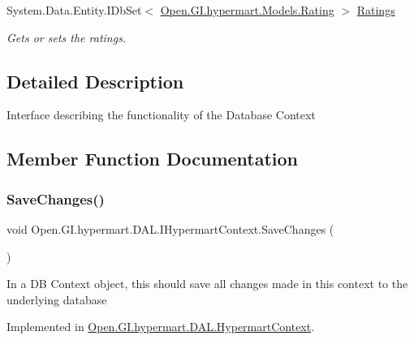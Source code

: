 \begin{DoxyCompactItemize}
System.\+Data.\+Entity.\+I\+Db\+Set$<$ \hyperlink{class_open_1_1_g_i_1_1hypermart_1_1_models_1_1_rating}{Open.\+G\+I.\+hypermart.\+Models.\+Rating} $>$ \hyperlink{interface_open_1_1_g_i_1_1hypermart_1_1_d_a_l_1_1_i_hypermart_context_a4e1ab8903a144091a90920c6e3e62d32}{Ratings}
\begin{DoxyCompactList}\small\item\em Gets or sets the ratings. \end{DoxyCompactList}\end{DoxyCompactItemize}


\subsection{Detailed Description}
Interface describing the functionality of the Database Context 



\subsection{Member Function Documentation}
\hypertarget{interface_open_1_1_g_i_1_1hypermart_1_1_d_a_l_1_1_i_hypermart_context_aacc5015260d97950f2a10d7673873304}{}\label{interface_open_1_1_g_i_1_1hypermart_1_1_d_a_l_1_1_i_hypermart_context_aacc5015260d97950f2a10d7673873304} 
\subsubsection{\texorpdfstring{Save\+Changes()}{SaveChanges()}}
{\footnotesize\ttfamily void Open.\+G\+I.\+hypermart.\+D\+A\+L.\+I\+Hypermart\+Context.\+Save\+Changes (\begin{DoxyParamCaption}{ }\end{DoxyParamCaption})}



In a DB Context object, this should save all changes made in this context to the underlying database 



Implemented in \hyperlink{class_open_1_1_g_i_1_1hypermart_1_1_d_a_l_1_1_hypermart_context_a53edb75fbc2507fc97eaf26e36d92f42}{Open.\+G\+I.\+hypermart.\+D\+A\+L.\+Hypermart\+Context}.



